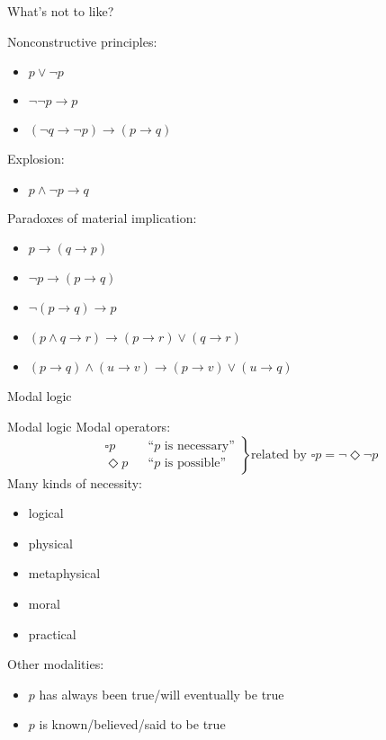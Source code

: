 \documentclass{beamer}
\newcommand{\nec}{\square}
\newcommand{\poss}{\Diamond}
\newcommand{\sect}[1]{\begin{frame}\centerline{\large #1}\end{frame}}
\begin{document}
\begin{frame}{What's not to like?}

Nonconstructive principles:
\begin{itemize}
\item $p\lor\lnot p$
\item $\lnot\lnot p\to p$
\item $(\neg q\to\neg p)\to (p\to q)$
\end{itemize}

Explosion:
\begin{itemize}
\item $p\land\lnot p\to q$
\end{itemize}

Paradoxes of material implication:
\begin{itemize}
\item $p\to (q\to p)$
\item $\lnot p\to (p\to q)$
\item $\lnot(p\to q)\to p$
\item $(p\land q\to r) \to (p\to r)\lor (q\to r)$
\item $(p\to q)\land (u\to v)\to (p\to v)\lor (u\to q)$
\end{itemize}
\vfill
\end{frame}

\sect{Modal logic}

\begin{frame}{Modal logic}
Modal operators:
\[ \left.\begin{aligned}
    &\nec p && \text{``$p$ is necessary''} \\
    &\poss p && \text{``$p$ is possible''}
\end{aligned}\right\}
    \text{related by $\nec p = \lnot\poss\lnot p$} \]
Many kinds of necessity:
\begin{itemize}
\item logical
\item physical
\item metaphysical
\item moral
\item practical
\end{itemize}
Other modalities:
\begin{itemize}
\item $p$ has always been true/will eventually be true
\item $p$ is known/believed/said to be true
\end{itemize}
\end{frame}
\end{document}
